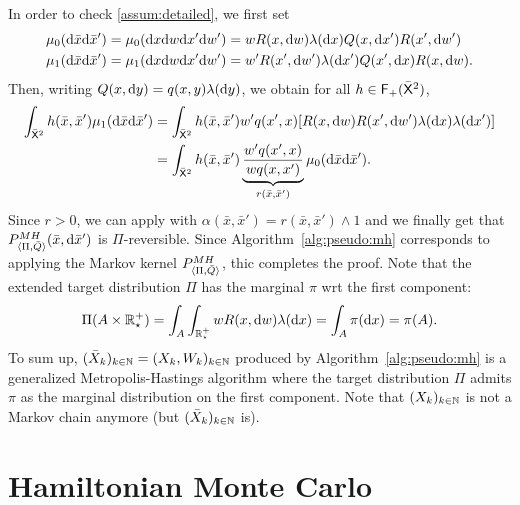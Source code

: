 \documentclass[english,graybox,envcountchap,envcountsame,sectrefs,shortlabels]{svmono}
\theoremstyle{style}
\begin{document}
In order to check \ref{assum:detailed}, we first set
\begin{align*}
\mu_0(\mathrm{d} \bar x \mathrm{d} \bar x')=\mu_0(\mathrm{d} x \mathrm{d} w \mathrm{d} x'\mathrm{d} w')&=w R(x,\mathrm{d} w) \lambda(\mathrm{d} x) Q(x,\mathrm{d} x') R(x',\mathrm{d} w')\\
\mu_1(\mathrm{d} \bar x \mathrm{d} \bar x')=\mu_1(\mathrm{d} x \mathrm{d} w \mathrm{d} x'\mathrm{d} w')&=w' R(x',\mathrm{d} w') \lambda(\mathrm{d} x') Q(x',\mathrm{d} x) R(x,\mathrm{d} w).
\end{align*}
Then, writing $Q(x,\mathrm{d} y)=q(x,y)\lambda(\mathrm{d} y)$, we obtain for all $h\in \mathsf{F_{+}}( \bar {\mathsf{X}}^2)$,
\begin{align*}
\int_{\bar{\mathsf{X}}^2} h(\bar x,\bar x') \mu_1(\mathrm{d} \bar x \mathrm{d} \bar x')&=\int_{\bar{\mathsf{X}}^2} h(\bar x,\bar x')  w' q(x',x) [R(x,\mathrm{d} w) R(x',\mathrm{d} w') \lambda(\mathrm{d} x) \lambda (\mathrm{d} x')]  \\
&=\int_{\bar{\mathsf{X}}^2} h(\bar x,\bar x') \underbrace{ \frac{w' q(x',x)}{w q(x,x')}}_{r(\bar x,\bar x')}\mu_0(\mathrm{d} \bar x \mathrm{d} \bar x').
\end{align*}
Since $r>0$, we can apply  with $\alpha(\bar x,\bar x')=r(\bar x,\bar x') \wedge 1$ and we finally get that $P_{\langle\Pi,\bar Q\rangle}^{MH}(\bar x,\mathrm{d} \bar x')$ is $\Pi$-reversible. Since Algorithm~\ref{alg:pseudo:mh} corresponds to applying the Markov kernel $P_{\langle\Pi,\bar Q\rangle}^{MH}$, thic completes the proof. Note that the extended target distribution $\Pi$ has the marginal $\pi$ wrt the first component:
$$
\Pi(A \times \mathbb{R}^+_\star)=\int_A \int_{\mathbb{R}^+_\star} w R(x,\mathrm{d} w) \lambda(\mathrm{d} x)=\int_A \pi(\mathrm{d} x)=\pi(A).
$$
To sum up, $(\bar X_k)_{k\in\mathbb{N}}=(X_k,W_k)_{k\in\mathbb{N}}$ produced by Algorithm~\ref{alg:pseudo:mh} is a generalized Metropolis-Hastings algorithm where the target distribution $\Pi$ admits $\pi$ as the marginal distribution on the first component.
Note that $(X_k)_{k\in\mathbb{N}}$ is not a Markov chain anymore (but $(\bar X_k)_{k\in\mathbb{N}}$ is).


\section{Hamiltonian Monte Carlo}
\end{document}
